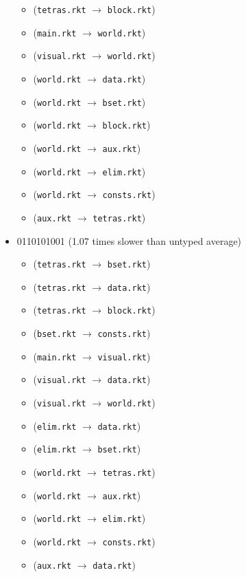 \documentclass{article}
\newcommand{\mono}[1]{\texttt{#1}}
\begin{document}
\begin{itemize}
\begin{itemize}
  \item (\mono{tetras.rkt} $\rightarrow$ \mono{block.rkt})
  \item (\mono{main.rkt} $\rightarrow$ \mono{world.rkt})
  \item (\mono{visual.rkt} $\rightarrow$ \mono{world.rkt})
  \item (\mono{world.rkt} $\rightarrow$ \mono{data.rkt})
  \item (\mono{world.rkt} $\rightarrow$ \mono{bset.rkt})
  \item (\mono{world.rkt} $\rightarrow$ \mono{block.rkt})
  \item (\mono{world.rkt} $\rightarrow$ \mono{aux.rkt})
  \item (\mono{world.rkt} $\rightarrow$ \mono{elim.rkt})
  \item (\mono{world.rkt} $\rightarrow$ \mono{consts.rkt})
  \item (\mono{aux.rkt} $\rightarrow$ \mono{tetras.rkt})
  \end{itemize}
\item 0110101001 (1.07 times slower than untyped average)
  \begin{itemize}
  \item (\mono{tetras.rkt} $\rightarrow$ \mono{bset.rkt})
  \item (\mono{tetras.rkt} $\rightarrow$ \mono{data.rkt})
  \item (\mono{tetras.rkt} $\rightarrow$ \mono{block.rkt})
  \item (\mono{bset.rkt} $\rightarrow$ \mono{consts.rkt})
  \item (\mono{main.rkt} $\rightarrow$ \mono{visual.rkt})
  \item (\mono{visual.rkt} $\rightarrow$ \mono{data.rkt})
  \item (\mono{visual.rkt} $\rightarrow$ \mono{world.rkt})
  \item (\mono{elim.rkt} $\rightarrow$ \mono{data.rkt})
  \item (\mono{elim.rkt} $\rightarrow$ \mono{bset.rkt})
  \item (\mono{world.rkt} $\rightarrow$ \mono{tetras.rkt})
  \item (\mono{world.rkt} $\rightarrow$ \mono{aux.rkt})
  \item (\mono{world.rkt} $\rightarrow$ \mono{elim.rkt})
  \item (\mono{world.rkt} $\rightarrow$ \mono{consts.rkt})
  \item (\mono{aux.rkt} $\rightarrow$ \mono{data.rkt})
  \end{itemize}

\end{itemize}
\end{document}
